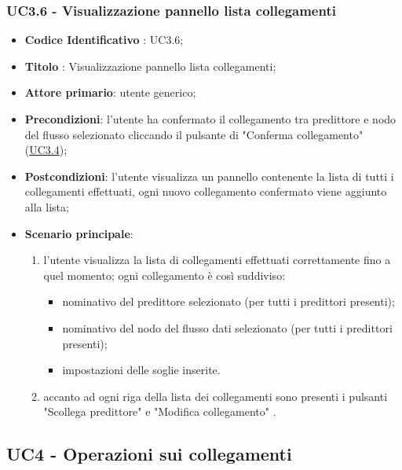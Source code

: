 	\subsubsection{UC3.6 - Visualizzazione pannello lista collegamenti}
		\begin{itemize}
			\item\textbf{Codice Identificativo} : UC3.6;
			\item\textbf{Titolo} : Visualizzazione pannello lista collegamenti;
			\item\textbf{Attore primario}: utente generico;
			\item\textbf{Precondizioni}: l'utente ha confermato il collegamento tra predittore e nodo del flusso selezionato cliccando il pulsante di "Conferma collegamento" (\hyperref[par:UC3.4]{UC3.4});
			\item\textbf{Postcondizioni}: l'utente visualizza un pannello contenente la lista di tutti i collegamenti effettuati, ogni nuovo collegamento confermato viene aggiunto alla lista;
			\item\textbf{Scenario principale}:
				\begin{enumerate}
					\item l'utente visualizza la lista di collegamenti effettuati correttamente fino a quel momento; ogni collegamento è così suddiviso:
					\begin{itemize}
						\item nominativo del predittore selezionato (per tutti i predittori presenti);
						\item nominativo del nodo del flusso dati selezionato (per tutti i predittori presenti);
						\item impostazioni delle soglie inserite.
					\end{itemize}
					\item accanto ad ogni riga della lista dei collegamenti sono presenti i pulsanti "Scollega predittore" e "Modifica collegamento" .	
				\end{enumerate}		
		\end{itemize}



	\label{par:UC4}
	\subsection{UC4 - Operazioni sui collegamenti}

